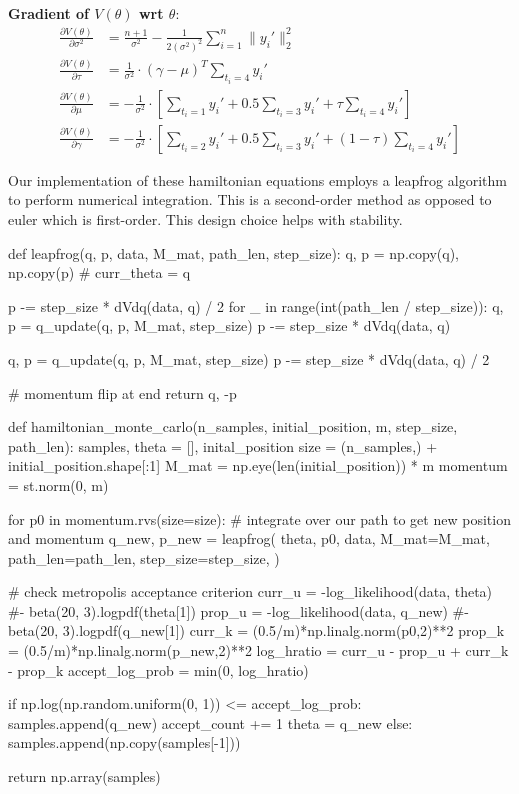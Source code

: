 \documentclass[12pt,letterpaper,twoside]{article}
\begin{document}
\textbf{Gradient of $V(\theta)$ wrt $\theta$}: 
\begin{align*}
    \frac{\partial V(\theta)}{\partial \sigma^2} & = \frac{n+1}{\sigma^2} - \frac{1}{2(\sigma^2)^2}\sum_{i=1}^n \|y_i'\|^2_2 \\
    \frac{\partial V(\theta)}{\partial \tau} & = \frac{1}{\sigma^2} \cdot (\gamma - \mu)^T \sum_{t_i=4} y_i' \\
    \frac{\partial V(\theta)}{\partial \mu} & = - \frac{1}{\sigma^2} \cdot \left[\sum_{t_i=1} y_i' + 0.5\sum_{t_i=3} y_i' + \tau\sum_{t_i=4} y_i'\right]\\
    \frac{\partial V(\theta)}{\partial \gamma} & = - \frac{1}{\sigma^2} \cdot \left[\sum_{t_i=2} y_i' + 0.5\sum_{t_i=3} y_i' + (1-\tau)\sum_{t_i=4} y_i'\right]
\end{align*}

Our implementation of these hamiltonian equations employs a 
leapfrog algorithm to perform numerical integration. This is 
a second-order method as opposed to euler which is first-order. 
This design choice helps with stability.
\begin{python}
def leapfrog(q, p, data, M_mat, path_len, step_size):
    q, p = np.copy(q), np.copy(p)  # curr_theta = q

    p -= step_size * dVdq(data, q) / 2
    for _ in range(int(path_len / step_size)):
        q, p = q_update(q, p, M_mat, step_size)
        p -= step_size * dVdq(data, q)

    q, p = q_update(q, p, M_mat, step_size)
    p -= step_size * dVdq(data, q) / 2

    # momentum flip at end
    return q, -p
\end{python}

\begin{python}
def hamiltonian_monte_carlo(n_samples, initial_position, m, step_size, path_len):
    samples, theta = [], inital_position
    size = (n_samples,) + initial_position.shape[:1]
    M_mat = np.eye(len(initial_position)) * m
    momentum = st.norm(0, m)

    for p0 in momentum.rvs(size=size):
        # integrate over our path to get new position and momentum
        q_new, p_new = leapfrog(
            theta,
            p0,
            data,
            M_mat=M_mat,
            path_len=path_len,
            step_size=step_size,
        )

        # check metropolis acceptance criterion
        curr_u = -log_likelihood(data, theta) #- beta(20, 3).logpdf(theta[1])
        prop_u = -log_likelihood(data, q_new) #- beta(20, 3).logpdf(q_new[1])
        curr_k = (0.5/m)*np.linalg.norm(p0,2)**2
        prop_k = (0.5/m)*np.linalg.norm(p_new,2)**2
        log_hratio = curr_u - prop_u + curr_k - prop_k
        accept_log_prob = min(0, log_hratio)

        if np.log(np.random.uniform(0, 1)) <= accept_log_prob:
            samples.append(q_new)
            accept_count += 1
            theta = q_new
        else:
            samples.append(np.copy(samples[-1]))

    return np.array(samples)
\end{python}
\end{document}
